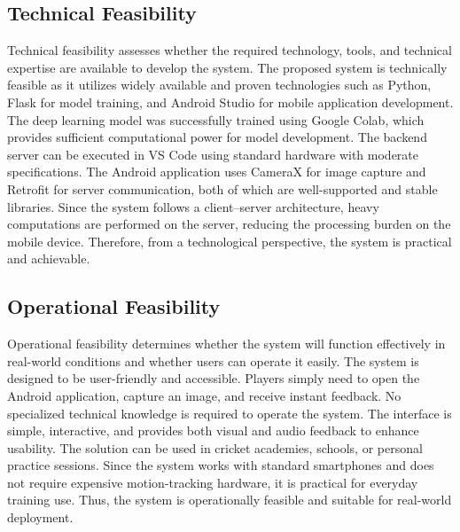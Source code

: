\subsection{Technical Feasibility}  
Technical feasibility assesses whether the required technology, tools, and technical expertise are available to develop the system.
The proposed system is technically feasible as it utilizes widely available and proven technologies such as Python, Flask for model training, and Android Studio for mobile application development. The deep learning model was successfully trained using Google Colab, which provides sufficient computational power for model development. The backend server can be executed in VS Code using standard hardware with moderate specifications.
The Android application uses CameraX for image capture and Retrofit for server communication, both of which are well-supported and stable libraries. Since the system follows a client–server architecture, heavy computations are performed on the server, reducing the processing burden on the mobile device. Therefore, from a technological perspective, the system is practical and achievable.

\subsection{Operational Feasibility}
Operational feasibility determines whether the system will function effectively in real-world conditions and whether users can operate it easily.
The system is designed to be user-friendly and accessible. Players simply need to open the Android application, capture an image, and receive instant feedback. No specialized technical knowledge is required to operate the system. The interface is simple, interactive, and provides both visual and audio feedback to enhance usability.
The solution can be used in cricket academies, schools, or personal practice sessions. Since the system works with standard smartphones and does not require expensive motion-tracking hardware, it is practical for everyday training use. Thus, the system is operationally feasible and suitable for real-world deployment.

